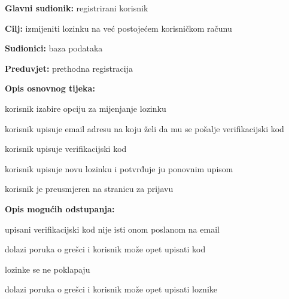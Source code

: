 					\noindent {}
					\begin{packed_item}
	
						\item \textbf{Glavni sudionik: }registrirani korisnik
						\item  \textbf{Cilj:} izmijeniti lozinku na već postojećem korisničkom računu
						\item  \textbf{Sudionici:} baza podataka
						\item  \textbf{Preduvjet:} prethodna registracija
						\item  \textbf{Opis osnovnog tijeka:}
						
						\item[] \begin{packed_enum}
	
							\item korisnik izabire opciju za mijenjanje lozinku
							\item korisnik upisuje email adresu na koju želi da mu se pošalje verifikacijski kod
							\item korisnik upisuje verifikacijski kod
							\item korisnik upisuje novu lozinku i potvrđuje ju ponovnim upisom
							\item korisnik je preusmjeren na stranicu za prijavu
						\end{packed_enum}
						
						\item  \textbf{Opis mogućih odstupanja:}
						
						\item[] \begin{packed_item}
	
							\item[3.a] upisani verifikacijski kod nije isti onom poslanom na email
							\item[] \begin{packed_enum}
								
								\item dolazi poruka o grešci i korisnik može opet upisati kod
								
							\end{packed_enum}
							\item[4.a] lozinke se ne poklapaju
							
							\begin{packed_enum}
								
								\item dolazi poruka o grešci i korisnik može opet upisati loznike
								

\end{packed_enum}
\end{packed_item}
\end{packed_item}
